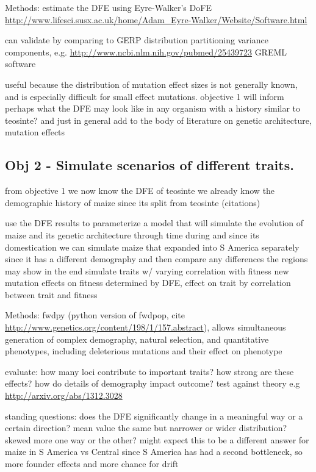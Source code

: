 \documentclass[10pt, letterpaper]{article}
\newcommand{\jri}[1]{\todo[size=\scriptsize, color=red]{#1}}
\newcommand{\kjg}[1]{\todo[size=\scriptsize, color=blue]{#1}}
\begin{document}
	Methods: estimate the DFE using Eyre-Walker's DoFE \url{http://www.lifesci.susx.ac.uk/home/Adam_Eyre-Walker/Website/Software.html}
	
\kjg{this part prob not in proposal:}
	can validate by comparing to
		GERP distribution
		partitioning variance components, e.g. \url{http://www.ncbi.nlm.nih.gov/pubmed/25439723}
		GREML software
				

	useful because the distribution of mutation effect sizes is not generally known, and is especially difficult for small effect mutations.
	objective 1 will inform perhaps what the DFE may look like in any organism with a history similar to teosinte? 
	and just in general add to the body of literature on genetic architecture, mutation effects

	
\subsection{Obj 2 - Simulate scenarios of different traits.}
	
	from objective 1 we now know the DFE of teosinte
	we already know the demographic history of maize since its split from teosinte (citations)
	
	use the DFE results to parameterize a model that will simulate the evolution of maize and its genetic architecture through time during and since its domestication
	we can simulate maize that expanded into S America separately since it has a different demography and then compare any differences the regions may show in the end
		simulate traits w/ varying correlation with fitness
		new mutation effects on fitness determined by DFE, effect on trait by correlation between trait and fitness
	
	Methods: fwdpy (python version of fwdpop, cite \url{http://www.genetics.org/content/198/1/157.abstract}), allows simultaneous generation of complex demography, natural selection, and quantitative phenotypes, including deleterious mutations and their effect on phenotype
	
	evaluate:
		how many loci contribute to important traits?
		how strong are these effects?
		how do details of demography impact outcome?
		test against theory e.g \url{http://arxiv.org/abs/1312.3028}
	
	standing questions:
		does the DFE significantly change in a meaningful way or a certain direction?
			mean value the same but narrower or wider distribution?
			skewed more one way or the other?
		might expect this to be a different answer for maize in S America vs Central since S America has had a second bottleneck, so more founder effects and more chance for drift
	
\end{document}
